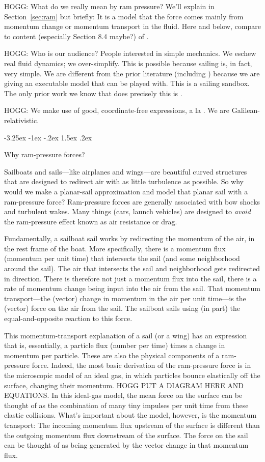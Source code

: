 \documentclass[letterpaper]{article}
\makeatletter
\newcommand{\secref}[1]{Section~\ref{#1}}
\renewcommand\section{\@startsection {section}{1}{\z@}%
  {-3.25ex \@plus -1ex \@minus -.2ex}%
  {1.5ex \@plus .2ex}%
  {\raggedright\normalfont\large\bfseries}}
\makeatother
\begin{document}
HOGG: What do we really mean by ram pressure?
We'll explain in \secref{sec:ram} but briefly:
It is a model that the force comes mainly from momentum change or momentum transport in the fluid. Here and below, compare to content (especially Section 8.4 maybe?) of \cite{symmetry}.

HOGG: Who is our audience? People interested in simple mechanics.
We eschew real fluid dynamics; we over-simplify.
This is possible because sailing is, in fact, very simple.
We are different from the prior literature (including \cite{symmetry, explained, sails}) because we are giving an executable model that can be played with.
This is a sailing sandbox.
The only prior work we know that does precisely this is \cite{tao}.

HOGG: We make use of good, coordinate-free expressions, a la \cite{kusse}.
We are Galilean-relativistic.

\section{Why ram-pressure forces?}\label{sec:ram}

Sailboats and sails---like airplanes and wings---are beautiful curved structures that are designed to redirect air with as little turbulence as possible.
So why would we make a planar-sail approximation and model that planar sail with a ram-pressure force?
Ram-pressure forces are generally associated with bow shocks and turbulent wakes.
Many things (cars, launch vehicles) are designed to \emph{avoid} the ram-pressure effect known as air resistance or drag.

Fundamentally, a sailboat sail works by redirecting the momentum of the air, in the rest frame of the boat.
More specifically, there is a momentum flux (momentum per unit time) that intersects the sail (and some neighborhood around the sail).
The air that intersects the sail and neighborhood gets redirected in direction.
There is therefore not just a momentum flux into the sail, there is a rate of momentum change being input into the air from the sail.
That momentum transport---the (vector) change in momentum in the air per unit time---is the (vector) force on the air from the sail.
The sailboat sails using (in part) the equal-and-opposite reaction to this force.

This momentum-transport explanation of a sail (or a wing) has an expression that is, essentially, a particle flux (number per time) times a change in momentum per particle.
These are also the physical components of a ram-pressure force.
Indeed, the most basic derivation of the ram-pressure force is in the microscopic model of an ideal gas, in which particles bounce elastically off the surface, changing their momentum.
HOGG PUT A DIAGRAM HERE AND EQUATIONS.
In this ideal-gas model, the mean force on the surface can be thought of as the combination of many tiny impulses per unit time from these elastic collisions.
What's important about the model, however, is the momentum transport:
The incoming momentum flux upstream of the surface is different than the outgoing momentum flux downstream of the surface.
The force on the sail can be thought of as being generated by the vector change in that momentum flux.
\end{document}

